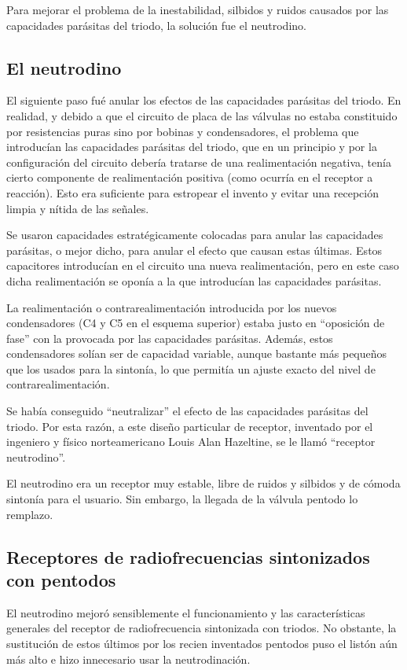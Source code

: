 \documentclass[letterpaper,10pt,spanish]{sphinxmanual}
\let\sphinxpxdimen\pdfpxdimen\else\newdimen\sphinxpxdimen
\begin{document}
Para mejorar el problema de la inestabilidad, silbidos y ruidos causados por las capacidades parásitas del triodo, la solución fue el neutrodino.


\subsection{El neutrodino}
\label{\detokenize{introduccion/sistemas:El-neutrodino}}
El siguiente paso fué anular los efectos de las capacidades parásitas del triodo. En realidad, y debido a que el circuito de placa de las válvulas no estaba constituido por resistencias puras sino por bobinas y condensadores, el problema que introducían las capacidades parásitas del triodo, que en un principio y por la configuración del circuito debería tratarse de una realimentación negativa, tenía cierto componente de realimentación positiva (como ocurría en el receptor a reacción). Esto era
suficiente para estropear el invento y evitar una recepción limpia y nítida de las señales.

Se usaron capacidades estratégicamente colocadas para anular las capacidades parásitas, o mejor dicho, para anular el efecto que causan estas últimas. Estos capacitores introducían en el circuito una nueva realimentación, pero en este caso dicha realimentación se oponía a la que introducían las capacidades parásitas.

\sphinxincludegraphics[width=588\sphinxpxdimen,height=226\sphinxpxdimen]{{receprfs3low}.png}

La realimentación o contra\sphinxhyphen{}realimentación introducida por los nuevos condensadores (C4 y C5 en el esquema superior) estaba justo en “oposición de fase” con la provocada por las capacidades parásitas. Además, estos condensadores solían ser de capacidad variable, aunque bastante más pequeños que los usados para la sintonía, lo que permitía un ajuste exacto del nivel de contra\sphinxhyphen{}realimentación.

Se había conseguido “neutralizar” el efecto de las capacidades parásitas del triodo. Por esta razón, a este diseño particular de receptor, inventado por el ingeniero y físico norteamericano Louis Alan Hazeltine, se le llamó “receptor neutrodino”.

El neutrodino era un receptor muy estable, libre de ruidos y silbidos y de cómoda sintonía para el usuario. Sin embargo, la llegada de la válvula pentodo lo remplazo.


\subsection{Receptores de radiofrecuencias sintonizados con pentodos}
\label{\detokenize{introduccion/sistemas:Receptores-de-radiofrecuencias-sintonizados-con-pentodos}}
El neutrodino mejoró sensiblemente el funcionamiento y las características generales del receptor de radiofrecuencia sintonizada con triodos. No obstante, la sustitución de estos últimos por los recien inventados pentodos puso el listón aún más alto e hizo innecesario usar la neutrodinación.
\end{document}

